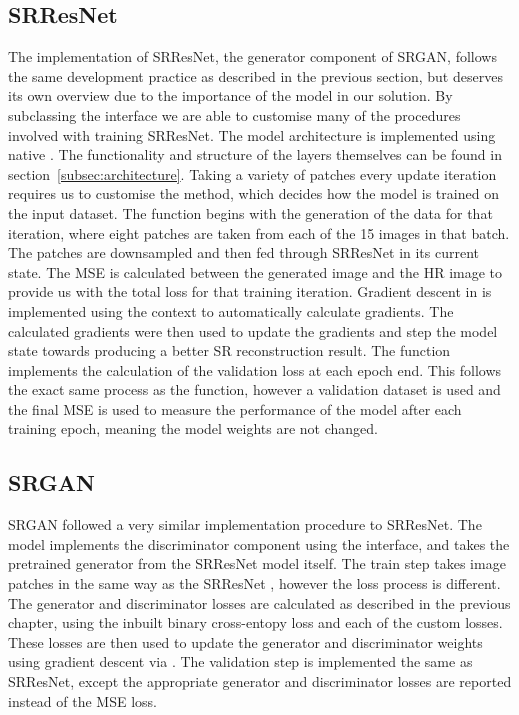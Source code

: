 \subsection{SRResNet}
The implementation of SRResNet, the generator component of SRGAN, follows the same development practice as described in the previous section, but deserves its own overview due to the importance of the model in our solution. By subclassing the  interface we are able to customise many of the procedures involved with training SRResNet. The model architecture is implemented using native . The functionality and structure of the layers themselves can be found in section~\ref{subsec:architecture}. Taking a variety of patches every update iteration requires us to customise the  method, which decides how the model is trained on the input dataset. The  function begins with the generation of the data for that iteration, where eight patches are taken from each of the 15 images in that batch. The patches are downsampled and then fed through SRResNet in its current state. The MSE is calculated between the generated image and the HR image to provide us with the total loss for that training iteration. Gradient descent in  is implemented using the  context to automatically calculate gradients. The calculated gradients were then used to update the gradients and step the model state towards producing a better SR reconstruction result. The  function implements the calculation of the validation loss at each epoch end. This follows the exact same process as the  function, however a validation dataset is used and the final MSE is used to measure the performance of the model after each training epoch, meaning the model weights are not changed.

\subsection{SRGAN}
SRGAN followed a very similar implementation procedure to SRResNet. The model implements the discriminator component using the  interface, and takes the pretrained generator from the SRResNet model itself. The train step takes image patches in the same way as the SRResNet , however the loss process is different. The generator and discriminator losses are calculated as described in the previous chapter, using the inbuilt binary cross-entopy loss and each of the custom losses. These losses are then used to update the generator and discriminator weights using gradient descent via . The validation step is implemented the same as SRResNet, except the appropriate generator and discriminator losses are reported instead of the MSE loss.


